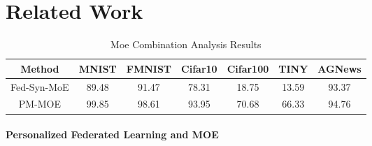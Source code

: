 \section{Related Work}
\begin{table}[tbp!]
\footnotesize 
    \centering
    \caption{Moe Combination Analysis Results}
    \label{tab:table3}
    \begin{tabular}{ccccccc}
        \toprule
        Method&MNIST&FMNIST	&Cifar10&Cifar100&TINY&AGNews \\
        \midrule
        Fed-Syn-MoE & 89.48 &91.47&78.31	&18.75	&13.59	&93.37 \\
        PM-MOE & 99.85	&98.61	&93.95	&70.68	&66.33	&94.76\\
        \bottomrule
    \end{tabular}
    \vspace{-0.3cm}
\end{table}

\paragraph{Personalized Federated Learning and MOE}


